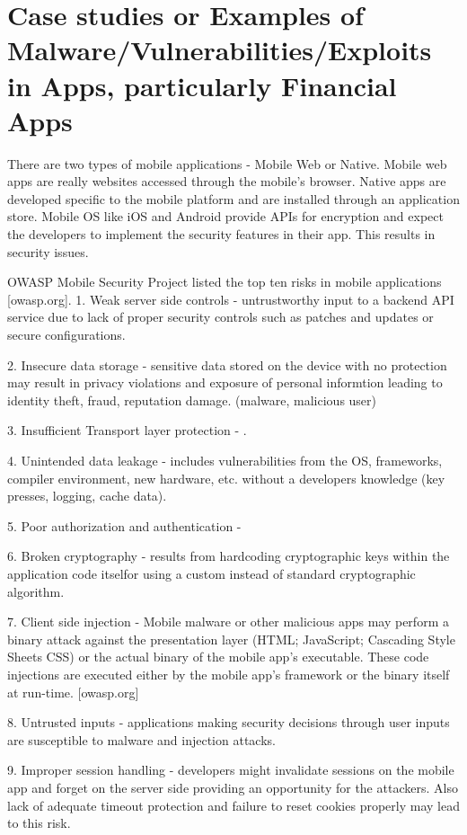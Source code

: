 \documentclass{mproj}
\begin{document}
\section{Case studies or Examples of Malware/Vulnerabilities/Exploits in Apps, particularly Financial Apps}
There are two types of mobile applications - Mobile Web or Native. Mobile web apps are really websites accessed through the mobile's browser. Native apps are developed specific to the mobile platform and are installed through an application store. Mobile OS like iOS and Android provide APIs for encryption and expect the developers to implement the security features in their app. This results in security issues.

OWASP Mobile Security Project listed the top ten risks in mobile applications [owasp.org].
1. Weak server side controls - untrustworthy input to a backend API service due to lack of proper security controls such as patches and updates or secure configurations.

2. Insecure data storage - sensitive data stored on the device with no protection may result in privacy violations and exposure of personal informtion leading to identity theft, fraud, reputation damage. (malware, malicious user)

3. Insufficient Transport layer protection - .

4. Unintended data leakage -  includes vulnerabilities from the OS, frameworks, compiler environment, new hardware, etc. without a developers knowledge (key presses, logging, cache data).

5. Poor authorization and authentication - 

6. Broken cryptography - results from hardcoding cryptographic keys within the application code itselfor using a custom instead of standard cryptographic algorithm.

7. Client side injection - Mobile malware or other malicious apps may perform a binary attack against the presentation layer (HTML; JavaScript; Cascading Style Sheets CSS) or the actual binary of the mobile app's executable. These code injections are executed either by the mobile app's framework or the binary itself at run-time. [owasp.org]

8. Untrusted inputs - applications making security decisions through user inputs are susceptible to malware and injection attacks.

9. Improper session handling - developers might invalidate sessions on the mobile app and forget on the server side providing an opportunity for the attackers. Also lack of adequate timeout protection and failure to reset cookies properly may lead to this risk.
\end{document}

